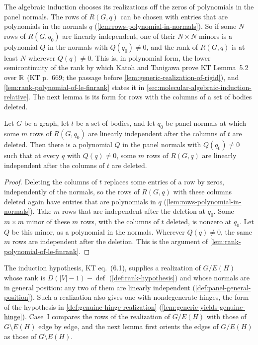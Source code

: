 The algebraic induction chooses its realizations off the zeros of
polynomials in the panel normals. The rows of $R(G,q)$ can be chosen
with entries that are polynomials in the normals $q$
(\cref{lem:rows-polynomial-in-normals}). So if some $N$ rows of
$R(G,q_0)$ are linearly independent, one of their $N \times N$ minors is
a polynomial $Q$ in the normals with $Q(q_0) \neq 0$, and the rank of
$R(G,q)$ is at least $N$ wherever $Q(q) \neq 0$. This is, in
polynomial form, the lower semicontinuity of the rank by which Katoh
and Tanigawa prove KT Lemma~5.2 over ${\mathbb{R}}$ (KT p.~669; the passage
before \cref{lem:generic-realization-of-rigid}), and
\cref{lem:rank-polynomial-of-le-finrank} states it in
\cref{sec:molecular-algebraic-induction-relative}. The next lemma is its
form for rows with the columns of a set of bodies deleted.

\begin{lemma}
  \label{lem:rank-polynomial-proj-eval}
  \leanok
  Let $G$ be a graph, let $t$ be a set of bodies, and let $q_0$ be panel
  normals at which some $m$ rows of $R(G,q_0)$ are linearly independent
  after the columns of $t$ are deleted. Then there is a polynomial $Q$ in
  the panel normals with $Q(q_0) \neq 0$ such that at every $q$ with
  $Q(q) \neq 0$, some $m$ rows of $R(G,q)$ are linearly independent after
  the columns of $t$ are deleted.
\end{lemma}
\begin{proof}
  \leanok
  Deleting the columns of $t$ replaces some entries of a row by zeros,
  independently of the normals, so the rows of $R(G,q)$ with these
  columns deleted again have entries that are polynomials in $q$
  (\cref{lem:rows-polynomial-in-normals}). Take $m$ rows that are
  independent after the deletion at $q_0$. Some $m \times m$ minor of
  these $m$ rows, with the columns of $t$ deleted, is nonzero at $q_0$.
  Let $Q$ be this minor, as a polynomial in the normals. Wherever
  $Q(q) \neq 0$, the same $m$ rows are independent after the deletion.
  This is the argument of \cref{lem:rank-polynomial-of-le-finrank}.
\end{proof}

The induction hypothesis, KT eq.~(6.1), supplies a realization of
$G/E(H)$ whose rank is $D(|V|-1) - \operatorname{def}$
(\cref{def:rank-hypothesis}) and whose normals are in general position:
any two of them are linearly independent
(\cref{def:panel-general-position}). Such a
realization also gives one with nondegenerate hinges, the form of the
hypothesis in \cref{def:genuine-hinge-realization}
(\cref{lem:generic-yields-genuine-hinge}). Case~I compares the rows of the
realization of $G/E(H)$ with those of $G \setminus E(H)$ edge by edge,
and the next lemma first orients the edges of $G/E(H)$ as those of
$G \setminus E(H)$.

